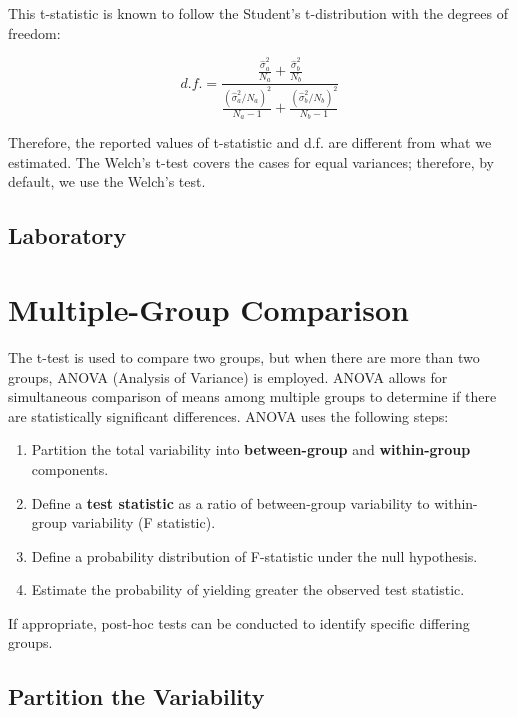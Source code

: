 \documentclass[
]{book}
\providecommand{\tightlist}{%
  \setlength{\itemsep}{0pt}\setlength{\parskip}{0pt}}
\begin{document}
This t-statistic is known to follow the Student's t-distribution with the degrees of freedom:

\[
d.f. = \frac{\frac{\hat{\sigma}^2_a}{N_a} + \frac{\hat{\sigma}^2_b}{N_b}}{\frac{(\hat{\sigma}^2_a / N_a)^2}{N_a - 1} + \frac{(\hat{\sigma}^2_b/N_b)^2}{N_b-1}}
\]

Therefore, the reported values of t-statistic and d.f. are different from what we estimated. The Welch's t-test covers the cases for equal variances; therefore, by default, we use the Welch's test.

\hypertarget{laboratory-3}{%
\section{Laboratory}\label{laboratory-3}}

\hypertarget{multiple-group-comparison}{%
\chapter{Multiple-Group Comparison}\label{multiple-group-comparison}}

The t-test is used to compare two groups, but when there are more than two groups, ANOVA (Analysis of Variance) is employed. ANOVA allows for simultaneous comparison of means among multiple groups to determine if there are statistically significant differences. ANOVA uses the following steps:

\begin{enumerate}
\def\labelenumi{\arabic{enumi}.}
\tightlist
\item
  Partition the total variability into \textbf{between-group} and \textbf{within-group} components.
\item
  Define a \textbf{test statistic} as a ratio of between-group variability to within-group variability (F statistic).
\item
  Define a probability distribution of F-statistic under the null hypothesis.
\item
  Estimate the probability of yielding greater the observed test statistic.
\end{enumerate}

If appropriate, post-hoc tests can be conducted to identify specific differing groups.

\hypertarget{partition-the-variability}{%
\section{Partition the Variability}\label{partition-the-variability}}
\end{document}
